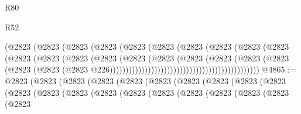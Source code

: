 \begin{lexlean}{R80}
\begin{lexlean}{R52}
\begin{coremodule}
{{{{{{{{{{{{{{{{{{{{{{{{{{{{{{{{{{{{{{{{{{{{{{{{{{{{{{{{{{{{{{{{{{{{{{{{{{{{{{{{{{{{{{{{{{{{{{{{{{{{{{{{{{{{{{{{{{{{{{{{{{{{{{{{{{{{{{{{{{{{{{{{{{{{{{{{{{{{{{{{{{{{{{{{{{{{{{{{{{{{{{{{{{{{{{{{{{{{{{                                                    (@2823
                                                      (@2823
                                                        (@2823
                                                          (@2823
                                                            (@2823
                                                              (@2823
                                                                (@2823
                                                                  (@2823
                                                                    (@2823
                                                                      (@2823
                                                                        (@2823
                                                                          (@2823
                                                                            (@2823
                                                                              (@2823
                                                                                (@2823
                                                                                  (@2823
                                                                                    (@2823
                                                                                      (@2823
                                                                                        (@2823
                                                                                          (@2823
                                                                                            (@2823
                                                                                              (@2823
                                                                                                (@2823
                                                                                                  @226)))))))))))))))))))))))))))))))))))))))))))))))
@4865 := @2823
    (@2823
      (@2823
        (@2823
          (@2823
            (@2823
              (@2823
                (@2823
                  (@2823
                    (@2823
                      (@2823
                        (@2823
                          (@2823
                            (@2823
                              (@2823
                                (@2823
                                  (@2823
                                    (@2823
                                      (@2823
                                        (@2823
                                          (@2823
}}}}}}}}}}}}}}}}}}}}}}}}}}}}}}}}}}}}}}}}}}}}}}}}}}}}}}}}}}}}}}}}}}}}}}}}}}}}}}}}}}}}}}}}}}}}}}}}}}}}}}}}}}}}}}}}}}}}}}}}}}}}}}}}}}}}}}}}}}}}}}}}}}}}}}}}}}}}}}}}}}}}}}}}}}}}}}}}}}}}}}}}}}}}}}}}}}}}}}
\end{coremodule}
\end{lexlean}
\end{lexlean}
